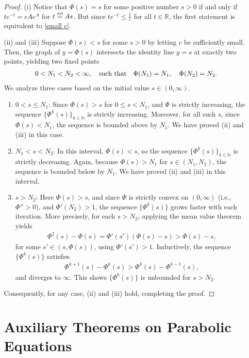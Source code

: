 \documentclass[reqno,11pt,final]{amsart}
\theoremstyle{plain}
\numberwithin{equation}{section}
\numberwithin{theorem}{section}
\newcommand{\eqdef }{\overset{\mbox{\tiny{def}}}{=}}
\begin{document}
\begin{proof}
(i) Notice that $\Phi(s)=s$ for some positive number $s>0$ if and only if $te^{-t} = cAe^{A}$ for $t\eqdef As$. 
But since $te^{-t}\le \frac{1}{e}$ for all $t\in\mathbb{R}$, the first statement is equivalent to \eqref{small c}.

(ii) and (iii) Suppose $\Phi(s)<s$ for some $s>0$ by letting $c$ be sufficiently small. Then, the graph of $y=\Phi(s)$ intersects the identity line $y=s$ at exactly two points, yielding two fixed points
\begin{align*}
0<N_1<N_2<\infty, \quad \textup{such that}\quad \Phi(N_1) = N_1, \quad \Phi(N_2) = N_2.
\end{align*}We analyze three cases based on the initial value $s\in(0,\infty)$.
\begin{enumerate}[label=Case \arabic*. , leftmargin=4em]
\item $0<s \le N_1$: Since $\Phi(s)>s$ for $0\le s<N_1$, and $\Phi$ is strictly increasing, the sequence $\{\Phi^k(s)\}_{k\in\mathbb{N}}$ is strictly increasing. Moreover, for all such $s$, since $\Phi(s)<N_1$, the sequence is bounded above by $N_1$. We have proved (ii) and (iii) in this case.
\item $N_1<s<N_2$: In this interval, $\Phi(s)<s$, so the sequence $\{\Phi^k(s)\}_{k\in\mathbb{N}}$ is strictly decreasing. Again, because $\Phi(s)>N_1$ for $s\in(N_1,N_2)$, the sequence is bounded below by $N_1$. We have proved (ii) and (iii) in this interval.
\item $s>N_2$: Here $\Phi(s)>s$, and since $\Phi$ is strictly convex on $(0,\infty)$ (i.e., $\Phi''>0$), and $\Phi'(N_2)>1$, the sequence $\{\Phi^k(s)\}$ grows faster with each iteration. More precisely, for each $s>N_2$, applying the mean value theorem yields
\begin{align*}
\Phi^2(s) - \Phi(s) = \Phi'(s')(\Phi(s) - s)>\Phi(s) - s,
\end{align*}for some $s'\in (s,\Phi(s))$, using $\Phi'(s')>1$. Inductively, the sequence $\{\Phi^k(s)\}$ satisfies
\begin{align*}
\Phi^{k+1}(s) - \Phi^k(s) > \Phi^k(s) - \Phi^{k-1}(s),
\end{align*}and diverges to $\infty$. This shows $\{\Phi^k(s)\}$ is unbounded for $s>N_2$.
\end{enumerate}
Consequently, for any case, (ii) and (iii) hold, completing the proof.
\end{proof}

\section{Auxiliary Theorems on Parabolic Equations}
\end{document}
